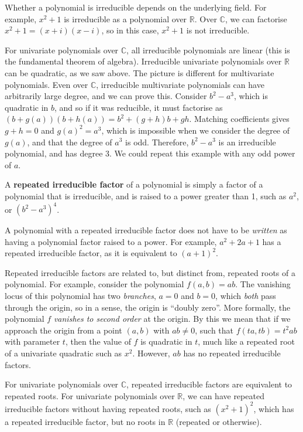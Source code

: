 \documentclass[12pt]{article}
\begin{document}
Whether a polynomial is irreducible depends on the underlying field. For example, $x^2 + 1$ is irreducible as a polynomial over $\mathbb{R}$. Over $\mathbb{C}$, we can factorise $x^2+1=(x+i)(x-i)$, so in this case, $x^2+1$ is not irreducible.

For univariate polynomials over $\mathbb{C}$, all irreducible polynomials are linear (this is the fundamental theorem of algebra). Irreducible univariate polynomials over $\mathbb{R}$ can be quadratic, as we saw above. The picture is different for multivariate polynomials. Even over $\mathbb{C}$, irreducible multivariate polynomials can have arbitrarily large degree, and we can prove this. Consider $b^2-a^3$, which is quadratic in $b$, and so if it was reducible, it must factorise as $(b+g(a))(b+h(a)) = b^2 + (g+h)b+gh$. Matching coefficients gives $g + h=0$ and $g(a)^2=a^3$, which is impossible when we consider the degree of $g(a)$, and that the degree of $a^3$ is odd. Therefore, $b^2-a^3$ is an irreducible polynomial, and has degree 3. We could repeat this example with any odd power of $a$.

A \textbf{repeated irreducible factor} of a polynomial is simply a factor of a polynomial that is irreducible, and is raised to a power greater than 1, such as $a^2$, or $\left(b^2 - a^3\right)^4$.

A polynomial with a repeated irreducible factor does not have to be \emph{written} as having a polynomial factor raised to a power. For example, $a^2 + 2a + 1$ has a repeated irreducible factor, as it is equivalent to $(a+1)^2$.

Repeated irreducible factors are related to, but distinct from, repeated roots of a polynomial. For example, consider the polynomial $f(a,b)=ab$. The vanishing locus of this polynomial has two \emph{branches}, $a=0$ and $b=0$, which \emph{both} pass through the origin, so in a sense, the origin is ``doubly zero''. More formally, the polynomial $f$ \emph{vanishes to second order} at the origin. By this we mean that if we approach the origin from a point $(a, b)$ with $ab\ne 0$, such that $f(ta,tb)=t^2ab$ with parameter $t$, then the value of $f$ is quadratic in $t$, much like a repeated root of a univariate quadratic such as $x^2$. However, $ab$ has no repeated irreducible factors.

For univariate polynomials over $\mathbb{C}$, repeated irreducible factors are equivalent to repeated roots. For univariate polynomials over $\mathbb{R}$, we can have repeated irreducible factors without having repeated roots, such as $\left(x^2+1\right)^2$, which has a repeated irreducible factor, but no roots in $\mathbb{R}$ (repeated or otherwise).
\end{document}
